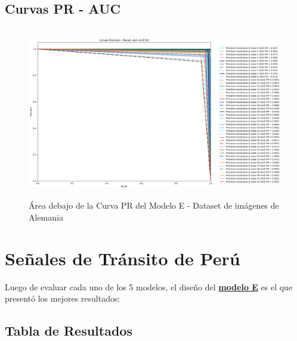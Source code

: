		\subsection{Curvas PR - AUC}  
					\begin{figure}[H]
						\includegraphics[width=\textwidth, height=7.5cm]{images/desarrollo/testResults/german/PR_curve_modelE} 
						\begin{center}
						\caption{\small{Área debajo de la Curva PR del Modelo E - Dataset de imágenes de Alemania}}
						{\small{\fontsize{10}{16.8}\selectfont {Fuente: Elaboración propia}}}
						\end{center}
						\vspace{-1.5em}
					\end{figure}		
	
	\section{Señales de Tránsito de Perú}

		Luego de evaluar cada uno de los 5 modelos, el diseño del \underline{\bf modelo E} es el que presentó los mejores resultados:

		\subsection{Tabla de Resultados}


